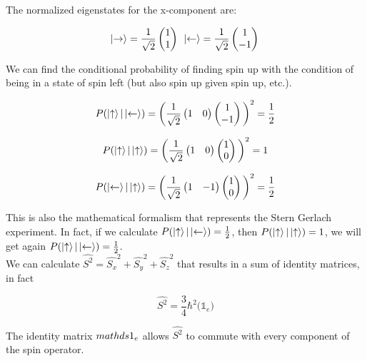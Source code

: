 	The normalized eigenstates for the x-component are:

	$$\ket{\rightarrow}=\frac{1}{\sqrt{2}}\begin{pmatrix}1\\1\end{pmatrix}\;\,\ket{\leftarrow}=\frac{1}{\sqrt{2}}\begin{pmatrix}1\\-1\end{pmatrix}\,$$

	We can find the conditional probability of finding spin up with the condition of being in a state of spin left (but also spin up given spin up, etc.).

	$$P(\ket{\uparrow}|\ket{\leftarrow})=\bigg(\frac{1}{\sqrt{2}}\begin{pmatrix}1&0\end{pmatrix}\begin{pmatrix}1\\-1\end{pmatrix}\bigg)^2=\frac{1}{2}$$

	$$P(\ket{\uparrow}|\ket{\uparrow})=\bigg(\frac{1}{\sqrt{2}}\begin{pmatrix}1&0\end{pmatrix}\begin{pmatrix}1\\0\end{pmatrix}\bigg)^2=1$$

	$$P(\ket{\leftarrow}|\ket{\uparrow})=\bigg(\frac{1}{\sqrt{2}}\begin{pmatrix}1&-1\end{pmatrix}\begin{pmatrix}1\\0\end{pmatrix}\bigg)^2=\frac{1}{2}$$

	This is also the mathematical formalism that represents the Stern Gerlach experiment.
In fact, if we calculate $P(\ket{\uparrow}|\ket{\leftarrow}) = \frac{1}{2}$, then $P(\ket{\uparrow}|\ket{\uparrow}) = 1$, we will get again $P(\ket{\uparrow}|\ket{\leftarrow}) = \frac{1}{2}$.
 \\
	We can calculate $\hat{S^2} = \hat{S_x}^2+\hat{S_y}^2+\hat{S_z}^2$ that results in a sum of identity matrices, in fact

	$$\hat{S^2}=\frac{3}{4}\hbar^2\big(\mathds{1}_e\big)$$

	The identity matrix $\\mathds{1}_e$ allows $\hat{S^2}$ to commute with every component of the spin operator.

